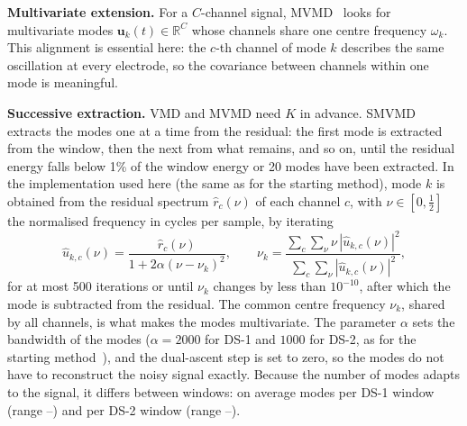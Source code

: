 \textbf{Multivariate extension.} For a $C$-channel signal, MVMD~\cite{rehman2019} looks for
multivariate modes $\mathbf{u}_k(t)\in\mathbb{R}^C$ whose channels share one centre frequency
$\omega_k$. This alignment is essential here: the $c$-th channel of mode $k$ describes the same
oscillation at every electrode, so the covariance between channels within one mode is meaningful.

\textbf{Successive extraction.} VMD and MVMD need $K$ in advance. SMVMD~\cite{liu2022} extracts
the modes one at a time from the residual: the first mode is extracted from the window, then the
next from what remains, and so on, until the residual energy falls below 1\% of the window
energy or 20 modes have been extracted. In the implementation used here (the same as for the
starting method), mode $k$ is obtained from the residual spectrum $\hat{r}_c(\nu)$ of each
channel $c$, with $\nu\in[0,\tfrac12]$ the normalised frequency in cycles per sample, by
iterating
\begin{equation}
\hat{u}_{k,c}(\nu) = \frac{\hat{r}_c(\nu)}{1 + 2\alpha(\nu-\nu_k)^2},
\qquad
\nu_k = \frac{\sum_c \sum_{\nu} \nu\, |\hat{u}_{k,c}(\nu)|^2}
             {\sum_c \sum_{\nu} |\hat{u}_{k,c}(\nu)|^2},
\label{eq:smvmd}
\end{equation}
for at most 500 iterations or until $\nu_k$ changes by less than $10^{-10}$, after which the mode
is subtracted from the residual. The common centre frequency $\nu_k$, shared by all channels, is
what makes the modes multivariate. The parameter $\alpha$ sets the bandwidth of the modes ($\alpha=2000$ for DS-1 and
$1000$ for DS-2, as for the starting method~\cite{chandela2025}), and the dual-ascent step is set
to zero, so the modes do not have to reconstruct the noisy signal exactly. Because the number of
modes adapts to the signal, it differs between windows: on average 
modes per DS-1 window (range --) and
 per DS-2 window (range --).

